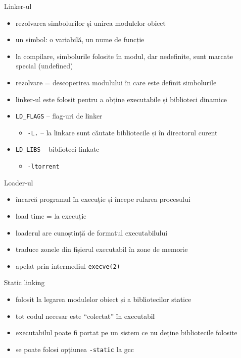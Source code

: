 \documentclass{beamer}
\begin{document}
\begin{frame}{Linker-ul}
  \begin{itemize}
    \item rezolvarea simbolurilor și unirea modulelor obiect
    \item un simbol: o variabilă, un nume de funcție
    \item la compilare, simbolurile folosite în modul, dar nedefinite, sunt
    marcate special (undefined)
    \item rezolvare = descoperirea modulului în care este definit simbolurile
    \item linker-ul este folosit pentru a obține executabile și biblioteci
    dinamice
    \item \texttt{LD\_FLAGS} -- flag-uri de linker
      \begin{itemize}
        \item \texttt{-L.} -- la linkare sunt căutate bibliotecile și în
        directorul curent
      \end{itemize}
    \item \texttt{LD\_LIBS} -- biblioteci linkate
      \begin{itemize}
        \item \texttt{-ltorrent}
      \end{itemize}
  \end{itemize}
\end{frame}

\begin{frame}{Loader-ul}
  \begin{itemize}
    \item încarcă programul în execuție și începe rularea procesului
    \item load time = la execuție
    \item loaderul are cunoștință de formatul executabilului
    \item traduce zonele din fișierul executabil în zone de memorie
    \item apelat prin intermediul \texttt{execve(2)}
  \end{itemize}
\end{frame}

\begin{frame}{Static linking}
  \begin{itemize}
    \item folosit la legarea modulelor obiect și a bibliotecilor statice
    \item tot codul necesar este ``colectat'' în executabil
    \item executabilul poate fi portat pe un sistem ce nu deține bibliotecile
    folosite
    \item se poate folosi opțiunea \texttt{-static} la gcc
  \end{itemize}
\end{frame}
\end{document}

